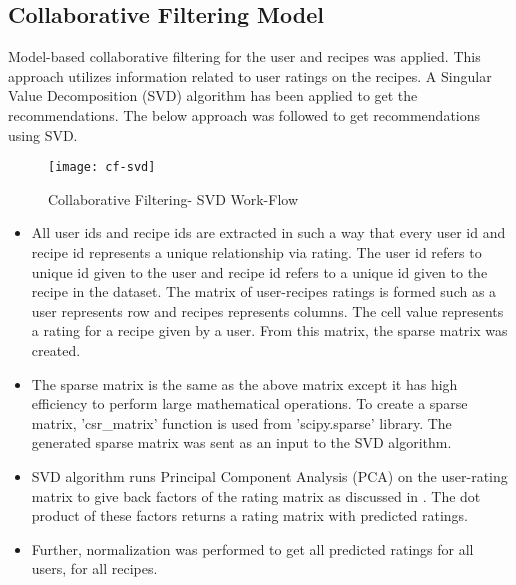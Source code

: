 \subsection{Collaborative Filtering Model}
\label{sec:cf}
Model-based collaborative filtering for the user and recipes was applied. This approach utilizes information related to user ratings on the recipes. A Singular Value Decomposition (SVD) algorithm has been applied to get the recommendations. The below approach was followed to get recommendations using SVD.
\begin{singlespace}
\begin{figure}[H]
\centering
\texttt{[image: cf-svd]}
\caption{Collaborative Filtering- SVD Work-Flow }
\label{fig:cf-svd}
\end{figure}
\end{singlespace}

\begin{itemize}
\item All user ids and recipe ids are extracted in such a way that every user id and recipe id represents a unique relationship via rating. The user id refers to unique id given to the user and recipe id refers to a unique id given to the recipe in the dataset. The matrix of user-recipes ratings is formed such as a user represents row and recipes represents columns. The cell value represents a rating for a recipe given by a user. From this matrix, the sparse matrix was created.
\item The sparse matrix is the same as the above matrix except it has high efficiency to perform large mathematical operations. To create a sparse matrix, 'csr\_matrix' function is used from 'scipy.sparse' library. The generated sparse matrix was sent as an input to the SVD algorithm.
\item SVD algorithm runs Principal Component Analysis (PCA) on the user-rating matrix to give back factors of the rating matrix as discussed in . The dot product of these factors returns a rating matrix with predicted ratings.
\item Further, normalization was performed to get all predicted ratings for all users, for all recipes.
\end{itemize}

